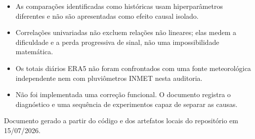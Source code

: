 \documentclass[11pt,a4paper]{article}
\begin{document}
\begin{itemize}
  \item As comparações identificadas como históricas usam hiperparâmetros diferentes e não são
  apresentadas como efeito causal isolado.
  \item Correlações univariadas não excluem relações não lineares; elas medem a dificuldade e a
  perda progressiva de sinal, não uma impossibilidade matemática.
  \item Os totais diários ERA5 não foram confrontados com uma fonte meteorológica independente
  nem com pluviômetros INMET nesta auditoria.
  \item Não foi implementada uma correção funcional. O documento registra o diagnóstico e uma
  sequência de experimentos capaz de separar as causas.
\end{itemize}

\vfill
\begin{center}
\color{muted}\small
Documento gerado a partir do código e dos artefatos locais do repositório em 15/07/2026.
\end{center}
\end{document}
